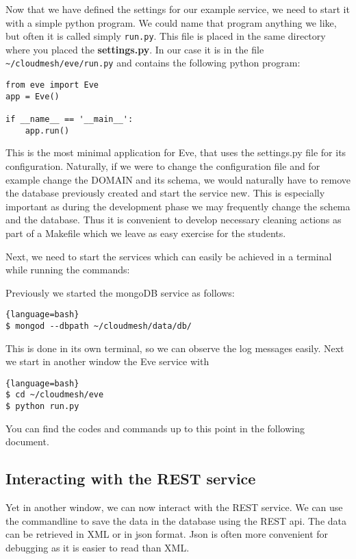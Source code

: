 Now that we have defined the settings for our example service, we need
to start it with a simple python program. We could name that program
anything we like, but often it is called simply \verb|run.py|. This
file is placed in the same directory where you placed the
\textbf{settings.py}. In our case it is in the file
\verb|~/cloudmesh/eve/run.py| and contains the following python
program:

\begin{lstlisting}
from eve import Eve
app = Eve()

if __name__ == '__main__':
    app.run()
\end{lstlisting}

This is the most minimal application for Eve, that uses the
settings.py file for its configuration. Naturally, if we were to
change the configuration file and for example change the DOMAIN and
its schema, we would naturally have to remove the database previously
created and start the service new. This is especially important as
during the development phase we may frequently change the schema and
the database. Thus it is convenient to develop necessary cleaning
actions as part of a Makefile which we leave as easy exercise for the
students.

Next, we need to start the services which can easily be achieved in a
terminal while running the commands:

Previously we started the mongoDB service as follows:

\begin{lstlisting}{language=bash}
$ mongod --dbpath ~/cloudmesh/data/db/
\end{lstlisting}

This is done in its own terminal, so we can observe the log messages easily.
Next we start in another window the Eve service with 

\begin{lstlisting}{language=bash}
$ cd ~/cloudmesh/eve
$ python run.py
\end{lstlisting}

You can find the codes and commands up to this point in the following document.

\subsection{Interacting with the REST service}

Yet in another window, we can now interact with the REST service.
We can use the commandline to save the data in the database using the
REST api. The data can be retrieved in XML or in json format. Json is
often more convenient for debugging as it is easier to read than XML.


